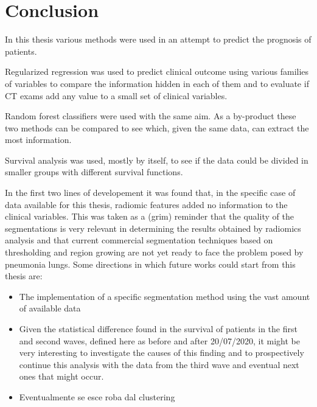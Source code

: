 \chapter{Conclusion}

In this thesis various methods were used in an attempt to predict the prognosis of \covid patients. 

Regularized regression was used to predict clinical outcome using various families of variables to compare the information hidden in each of them and to evaluate if CT exams add any value to a small set of clinical variables.

Random forest classifiers were used with the same aim. As a by-product these two methods can be compared to see which, given the same data, can extract the most information.

Survival analysis was used, mostly by itself, to see if the data could be divided in smaller groups with different survival functions.

In the first two lines of developement it was found that, in the specific case of data available for this thesis, radiomic features added no information to the clinical variables.
This was taken as a (grim) reminder that the quality of the segmentations is very relevant in determining the results obtained by radiomics analysis and that current commercial segmentation techniques based on thresholding and region growing are not yet ready to face the problem posed by \covid pneumonia lungs.
Some directions in which future works could start from this thesis are:

\begin{itemize}
\item The implementation of a \covid specific segmentation method using the vast amount of available data
\item Given the statistical difference found in the survival of patients in the first and second waves, defined here as before and after 20/07/2020, it might be very interesting to investigate the causes of this finding and to prospectively continue this analysis with the data from the third wave and eventual next ones that might occur.
\item Eventualmente se esce roba dal clustering
\end{itemize}